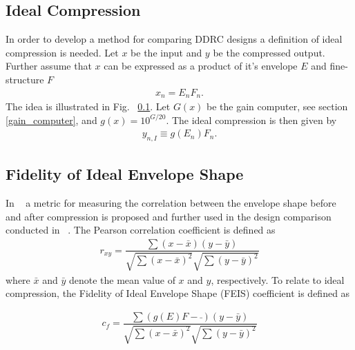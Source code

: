 \documentclass[../main2.tex]{subfiles}
\begin{document}
\subsection{Ideal Compression}
In order to develop a method for comparing DDRC designs a definition of ideal compression is needed. Let $x$ be the input and $y$ be the compressed output. Further assume that $x$ can be expressed as a product of it's envelope $E$ and fine-structure $F$ \begin{align}
x_n = E_nF_n.
\end{align}
The idea is illustrated in Fig. ~\ref{}. Let $G(x)$ be the gain computer, see section \ref{gain_computer}, and $g(x) = 10^{G/20}$. The ideal compression is then given by
\begin{align}
y_{n,I} \equiv g(E_n) F_n. 
\end{align}


\subsection{Fidelity of Ideal Envelope Shape} \label{fes}
In ~\cite{stone2007quantifying} a metric for measuring the correlation between the envelope shape before and after compression is proposed and further used in the design comparison conducted in ~\cite{reiss2012tutorial}. The Pearson correlation coefficient is defined as
\begin{align}
r_{xy} = \dfrac{\sum(x-\bar{x})(y-\bar{y})}{\sqrt{\sum(x-\bar{x})^2}\sqrt{\sum(y-\bar{y})^2}}
\end{align}
where $\bar{x}$ and $\bar{y}$ denote the mean value of $x$ and $y$, respectively. To relate to ideal compression, the Fidelity of Ideal Envelope Shape (FEIS) coefficient is defined as

\begin{align}
c_{f} = \dfrac{\sum(g(E)F-\bar{})(y-\bar{y})}{\sqrt{\sum(x-\bar{x})^2}\sqrt{\sum(y-\bar{y})^2}}
\end{align}
\end{document}
